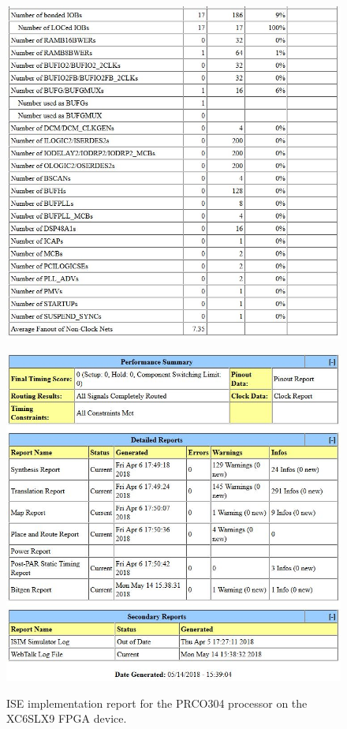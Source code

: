 \documentclass[11pt,a4paper]{report}
\newcommand{\scname}{PRCO304}
\begin{document}
\begin{figure}[H]
\begin{minipage}{0.5\textwidth}
\includegraphics[scale=0.43]{ise2}
    \end{minipage}
    \begin{minipage}{0.01\textwidth}\hfill\end{minipage}
    \begin{minipage}{0.5\textwidth}
        \centering
\includegraphics[scale=0.45]{ise3}\\
    \end{minipage}
    \caption{ISE implementation report for the \scname{} processor on the XC6SLX9 FPGA device.}
    \label{fig:}
\end{figure}
\end{document}
